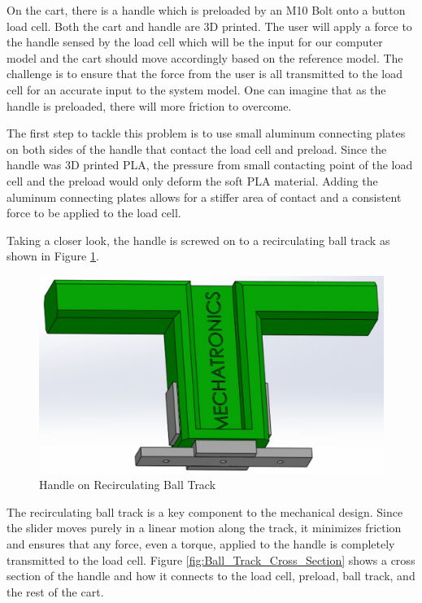 On the cart, there is a handle which is preloaded by an M10 Bolt onto a button load cell. Both the cart and handle are 3D printed. The user will apply a force to the handle sensed by the load cell which will be the input for our computer model and the cart should move accordingly based on the reference model. The challenge is to ensure that the force from the user is all transmitted to the load cell for an accurate input to the system model. One can imagine that as the handle is preloaded, there will more friction to overcome.\par

The first step to tackle this problem is to use small aluminum connecting plates on both sides of the handle that contact the load cell and preload. Since the handle was 3D printed PLA, the pressure from small contacting point of the load cell and the preload would only deform the soft PLA material. Adding the aluminum connecting plates allows for a stiffer area of contact and a consistent force to be applied to the load cell.

Taking a closer look, the handle is screwed on to a recirculating ball track as shown in Figure \ref{fig:Recirculating_Ball_Track}. 

\begin{figure}
\centering
\includegraphics[width=1\columnwidth]{Images/Recirculating_Ball_Track}
\caption{Handle on Recirculating Ball Track}
\label{fig:Recirculating_Ball_Track}
\end{figure}

The recirculating ball track is a key component to the mechanical design. Since the slider moves purely in a linear motion along the track, it minimizes friction and ensures that any force, even a torque, applied to the handle is completely transmitted to the load cell. Figure \ref{fig:Ball_Track_Cross_Section} shows a cross section of the handle and how it connects to the load cell, preload, ball track, and the rest of the cart.

